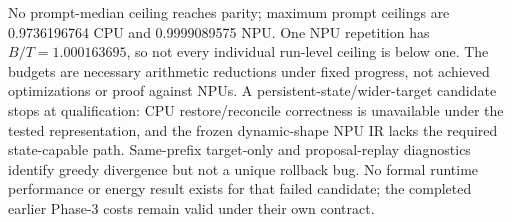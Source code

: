 No prompt-median ceiling reaches parity; maximum prompt ceilings are 0.9736196764 CPU and 0.9999089575 NPU. One NPU repetition has $B/T=1.000163695$, so not every individual run-level ceiling is below one. The budgets are necessary arithmetic reductions under fixed progress, not achieved optimizations or proof against NPUs. A persistent-state/wider-target candidate stops at qualification: CPU restore/reconcile correctness is unavailable under the tested representation, and the frozen dynamic-shape NPU IR lacks the required state-capable path. Same-prefix target-only and proposal-replay diagnostics identify greedy divergence but not a unique rollback bug. No formal runtime performance or energy result exists for that failed candidate; the completed earlier Phase-3 costs remain valid under their own contract.
